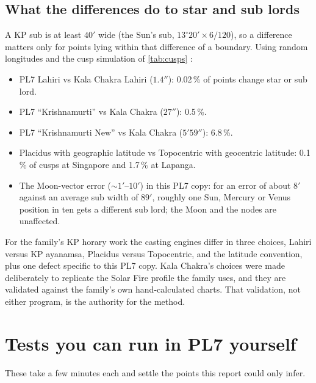 \subsection{What the differences do to star and sub lords}

A KP sub is at least $40'$ wide (the Sun's sub, $13^\circ 20' \times 6/120$), so a difference
matters only for points lying within that difference of a boundary. Using random longitudes and the cusp
simulation of \autoref{tab:cusps} \tagNUM:

\begin{itemize}[leftmargin=*]
  \item PL7 Lahiri vs Kala Chakra Lahiri ($1.4''$): 0.02\,\% of points change star or sub
  lord.
  \item PL7 ``Krishnamurti'' vs Kala Chakra ($27''$): 0.5\,\%.
  \item PL7 ``Krishnamurti New'' vs Kala Chakra ($5'59''$): 6.8\,\%.
  \item Placidus with geographic latitude vs Topocentric with geocentric latitude: 0.1\,\%
  of cusps at Singapore and 1.7\,\% at Lapanga.
  \item The Moon-vector error ($\sim\!1'$--$10'$) in this PL7 copy: for an error of
  about $8'$ against an average sub width of $89'$, roughly one Sun, Mercury or Venus position
  in ten gets a different sub lord; the Moon and the nodes are unaffected.
\end{itemize}

\begin{keybox}\kidea For the family's KP horary work the casting engines differ in three
choices, Lahiri versus KP ayanamsa, Placidus versus Topocentric, and the latitude
convention, plus one defect specific to this PL7 copy. Kala Chakra's choices were made
deliberately to replicate the Solar Fire profile the family uses, and they are validated
against the family's own hand-calculated charts. That validation, not either program, is
the authority for the method.\end{keybox}

\section{Tests you can run in PL7 yourself}
\label{sec:tests}

These take a few minutes each and settle the points this report could only infer.

